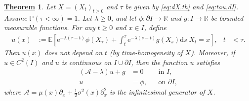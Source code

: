 \documentclass[12pt]{book}
\let\varphi\phi
\numberwithin{equation}{chapter}
\theoremstyle{plain}
\newtheorem{theorem}{\underline{Theorem}}
\numberwithin{theorem}{section}
\theoremstyle{definition}
\numberwithin{exercise}{chapter}
\newcommand{\<}{\langle}
\renewcommand{\>}{\rangle}
\renewcommand{\(}{\left(}
\renewcommand{\)}{\right)}
\renewcommand{\[}{\left[}
\renewcommand{\]}{\right]}
\newcommand\Eb{\mathds{E}}
\newcommand\Pb{\mathds{P}}
\newcommand\Rb{\mathds{R}}
\newcommand\Ac{\mathscr{A}}
\newcommand\sig{\sigma}
\newcommand\lam{\lambda}
\renewcommand\d{\partial}
\newcommand\dd{\mathrm{d}}
\newcommand\ee{\mathrm{e}}
\begin{document}
\begin{theorem}
\label{thm:Poisson}
Let $X = (X_t)_{t \geq 0}$ and $\tau$ be given by \eqref{eq:dX.th} and \eqref{eq:tau.dI}. Assume $\Pb(\tau < \infty) = 1$.  Let $\lam \geq 0$, and let $\varphi : \d I \to \Rb$ and $g: I \to \Rb$ be bounded measurable functions.  For any $t \geq 0$ and $x \in I$, define
\begin{align}
u(x)
	&:=	\Eb[ \ee^{-\lam(\tau-t)}\varphi(X_\tau) + \int_t^\tau \ee^{-\lam(s-t)}g(X_s) \dd s | X_t = x ] , &
t &< \tau . \label{eq:u-of-x}
\end{align}
Then $u(x)$ does not depend on $t$ (by time-homogeneity of $X$).  Moreover, if $u \in C^2(I)$ and $u$ is continuous on $I \cup \d I$, then the function $u$ satisfies
\begin{align}
(\Ac - \lam ) u + g
	&=	0 &
	&\text{in $I$} , \label{eq:Poisson.PDE} \\
u
	&=	\varphi , &
	&\text{on $\d I$} , \label{eq:Poisson.BC}
\end{align}
where $\Ac = \mu(x) \d_x + \tfrac{1}{2} \sig^2(x) \d_x^2$ is the infinitesimal generator of $X$.
\end{theorem}
\end{document}
